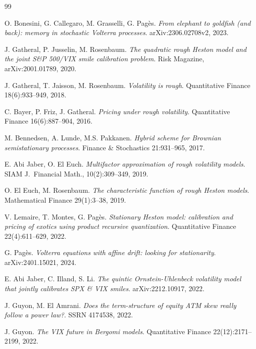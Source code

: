 \documentclass[11pt,a4paper]{article}
\theoremstyle{definition}
\newcommand{\1}{\mathbf{1}}
\begin{document}
\begin{thebibliography}{99}

 O. Bonesini, G. Callegaro, M. Grasselli, G. Pagès.
\newblock \textit{From elephant to goldfish (and back): memory in stochastic Volterra processes}.
\newblock arXiv:2306.02708v2, 2023.

 J. Gatheral, P. Jusselin, M. Rosenbaum.
\newblock \textit{The quadratic rough Heston model and the joint S\&P 500/VIX smile calibration problem}.
\newblock Risk Magazine, arXiv:2001.01789, 2020.

 J. Gatheral, T. Jaisson, M. Rosenbaum.
\newblock \textit{Volatility is rough}.
\newblock Quantitative Finance 18(6):933--949, 2018.

 C. Bayer, P. Friz, J. Gatheral.
\newblock \textit{Pricing under rough volatility}.
\newblock Quantitative Finance 16(6):887--904, 2016.

 M. Bennedsen, A. Lunde, M.S. Pakkanen.
\newblock \textit{Hybrid scheme for Brownian semistationary processes}.
\newblock Finance \& Stochastics 21:931--965, 2017.

 E. Abi Jaber, O. El Euch.
\newblock \textit{Multifactor approximation of rough volatility models}.
\newblock SIAM J.\ Financial Math., 10(2):309--349, 2019.

 O. El Euch, M. Rosenbaum.
\newblock \textit{The characteristic function of rough Heston models}.
\newblock Mathematical Finance 29(1):3--38, 2019.

 V. Lemaire, T. Montes, G. Pagès.
\newblock \textit{Stationary Heston model: calibration and pricing of exotics using product recursive quantization}.
\newblock Quantitative Finance 22(4):611--629, 2022.

 G. Pagès.
\newblock \textit{Volterra equations with affine drift: looking for stationarity}.
\newblock arXiv:2401.15021, 2024.

 E. Abi Jaber, C. Illand, S. Li.
\newblock \textit{The quintic Ornstein-Uhlenbeck volatility model that jointly calibrates SPX \& VIX smiles}.
\newblock arXiv:2212.10917, 2022.

 J. Guyon, M. El Amrani.
\newblock \textit{Does the term-structure of equity ATM skew really follow a power law?}.
\newblock SSRN 4174538, 2022.

 J. Guyon.
\newblock \textit{The VIX future in Bergomi models}.
\newblock Quantitative Finance 22(12):2171--2199, 2022.


\end{thebibliography}
\end{document}
